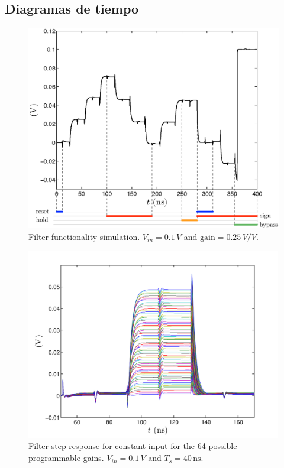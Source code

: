 \documentclass[11pt,letterpaper,spanish]{article}
\begin{document}
\subsection{Diagramas de tiempo}
\begin{figure}[!t]
	\centering
	\includegraphics[width=5in]{./figuras/test_filter_after_omni.eps}
	\caption{Filter functionality simulation. $V_\textit{in}=0.1\,V$ and $\text{gain}=0.25\,V/V$.}\label{fig:test_filter_after_omni}
\end{figure}

\begin{figure}[!t]
	\centering
	\includegraphics[width=4.4in]{./figuras/gain_curves.pdf}
	\caption[Filter step response for constant input for the 64 possible programmable gains.]{Filter step response for constant input for the 64 possible programmable gains. \mbox{$V_\textit{in}=0.1\,V$} and \mbox{$T_s=40\,\text{ns}$}.}\label{fig:gain_curves}
\end{figure}
\end{document}
